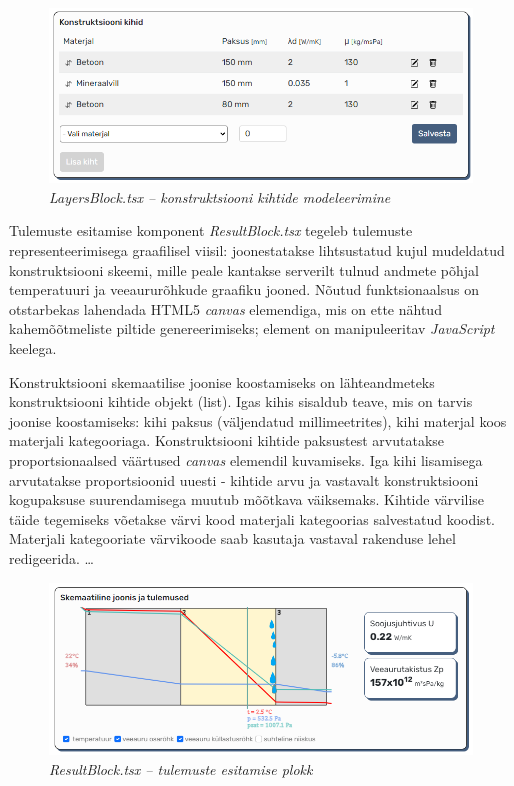 \begin{figure}[ht]
    \centering
    \includegraphics[width=1\textwidth]{figures/development/frontennd_layersblock.png}
    \caption[LayersBlock.tsx -- konstruktsiooni kihtide modeleerimine]{\textit{LayersBlock.tsx -- konstruktsiooni kihtide modeleerimine}}
    \label{fig:dev_frontend_layersblock}
\end{figure}


Tulemuste esitamise komponent \textit{ResultBlock.tsx} tegeleb tulemuste representeerimisega graafilisel viisil: joonestatakse lihtsustatud kujul mudeldatud konstruktsiooni skeemi, 
mille peale kantakse serverilt tulnud andmete põhjal temperatuuri ja veeaururõhkude graafiku jooned. Nõutud funktsionaalsus on otstarbekas lahendada HTML5 \textit{canvas} elemendiga, mis
on ette nähtud kahemõõtmeliste piltide genereerimiseks; element on manipuleeritav \textit{JavaScript} keelega. 

Konstruktsiooni skemaatilise joonise koostamiseks on lähteandmeteks konstruktsiooni kihtide objekt (list). Igas kihis sisaldub teave, mis on tarvis joonise koostamiseks: 
kihi paksus (väljendatud millimeetrites), kihi materjal koos materjali kategooriaga. 
Konstruktsiooni kihtide paksustest arvutatakse proportsionaalsed väärtused \textit{canvas} elemendil kuvamiseks. Iga kihi lisamisega arvutatakse proportsioonid uuesti - kihtide arvu
ja vastavalt konstruktsiooni kogupaksuse suurendamisega muutub mõõtkava väiksemaks. Kihtide värvilise täide tegemiseks võetakse värvi kood materjali kategoorias salvestatud koodist.
Materjali kategooriate värvikoode saab kasutaja vastaval rakenduse lehel redigeerida. 
\dots

\begin{figure}[ht]
    \centering
    \includegraphics[width=1\textwidth]{figures/development/frontennd_resultblock.png}
    \caption[ResultBlock.tsx -- tulemuste esitamise plokk]{\textit{ResultBlock.tsx -- tulemuste esitamise plokk}}
    \label{fig:development_frontend_results}
\end{figure}


